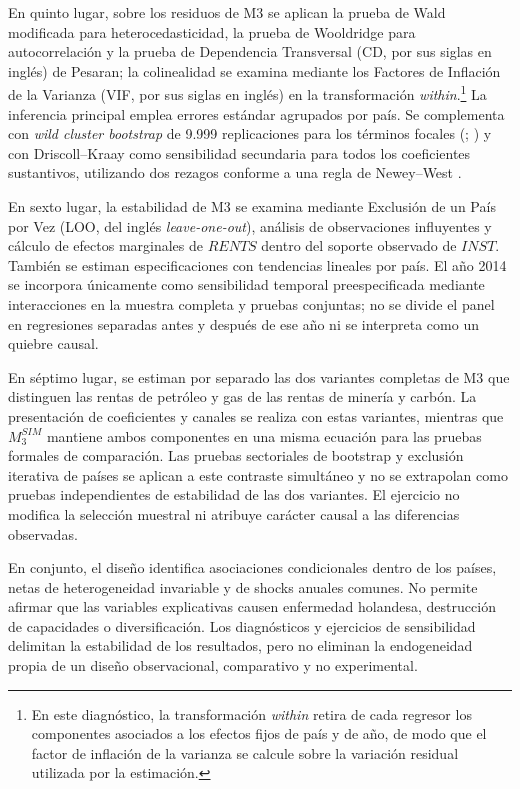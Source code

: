\documentclass[../../TFM.tex]{subfiles}
\begin{document}
	En quinto lugar, sobre los residuos de M3 se aplican la prueba de Wald
	modificada para heterocedasticidad, la prueba de Wooldridge para autocorrelación
	y la prueba de Dependencia Transversal (CD, por sus siglas en inglés) de
	Pesaran; la colinealidad se
	examina mediante los Factores de Inflación de la Varianza (VIF, por sus
	siglas en inglés) en la transformación
	\textit{within}.\footnote{En este diagnóstico, la transformación \textit{within}
	retira de cada regresor los componentes asociados a los efectos fijos de país y
	de año, de modo que el factor de inflación de la varianza se calcule sobre la
	variación residual utilizada por la estimación.} La inferencia principal emplea
	errores estándar agrupados por país. Se complementa con
	\textit{wild cluster bootstrap} de 9.999 replicaciones para los términos
	focales (\textcite{Cameron2008}; \textcite{Roodman2019}) y con
	Driscoll--Kraay como sensibilidad secundaria para todos los coeficientes
	sustantivos, utilizando dos rezagos conforme a una regla de Newey--West
	\parencite{Driscoll1998, NeweyWest1994}.

	En sexto lugar, la estabilidad de M3 se examina mediante Exclusión de un País
	por Vez (LOO, del inglés \textit{leave-one-out}), análisis de observaciones influyentes y cálculo
	de efectos marginales de $RENTS$ dentro del soporte observado de $INST$.
	También se estiman especificaciones con tendencias lineales por país. El año
	2014 se incorpora únicamente como sensibilidad temporal preespecificada
	mediante interacciones en la muestra completa y pruebas conjuntas; no se divide
	el panel en regresiones separadas antes y después de ese año ni se interpreta
	como un quiebre causal.

	En séptimo lugar, se estiman por separado las dos variantes completas de M3 que
	distinguen las rentas de petróleo y gas de las rentas de minería y carbón. La
	presentación de coeficientes y canales se realiza con estas variantes, mientras
	que $M_{3}^{SIM}$ mantiene ambos componentes en una misma ecuación para las
	pruebas formales de comparación. Las pruebas sectoriales de bootstrap y
	exclusión iterativa de países se aplican a este contraste simultáneo y no se
	extrapolan como pruebas independientes de estabilidad de las dos variantes.
	El ejercicio no modifica la selección muestral ni atribuye carácter causal a
	las diferencias observadas.

	En conjunto, el diseño identifica asociaciones condicionales dentro de los
	países, netas de heterogeneidad invariable y de shocks anuales comunes. No
	permite afirmar que las variables explicativas causen enfermedad holandesa,
	destrucción de capacidades o diversificación. Los diagnósticos y ejercicios de
	sensibilidad delimitan la estabilidad de los resultados, pero no eliminan la
	endogeneidad propia de un diseño observacional, comparativo y no experimental.
\end{document}
